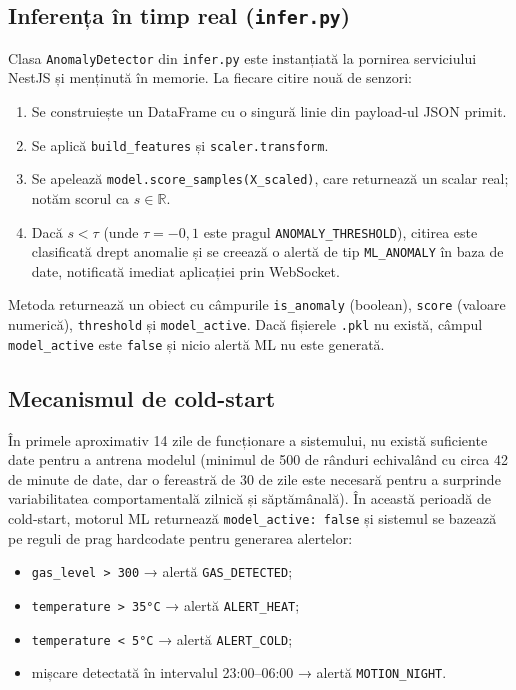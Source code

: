 \subsection{Inferența în timp real (\texttt{infer.py})}

Clasa \texttt{AnomalyDetector} din \texttt{infer.py} este instanțiată la pornirea
serviciului NestJS și menținută în memorie. La fiecare citire nouă de senzori:

\begin{enumerate}
  \item Se construiește un DataFrame cu o singură linie din payload-ul JSON primit.
  \item Se aplică \texttt{build\_features} și \texttt{scaler.transform}.
  \item Se apelează \texttt{model.score\_samples(X\_scaled)}, care returnează un scalar
    real; notăm scorul ca $s \in \mathbb{R}$.
  \item Dacă $s < \tau$ (unde $\tau = -0{,}1$ este pragul \texttt{ANOMALY\_THRESHOLD}),
    citirea este clasificată drept anomalie și se creează o alertă de tip
    \texttt{ML\_ANOMALY} în baza de date, notificată imediat aplicației prin WebSocket.
\end{enumerate}

Metoda returnează un obiect cu câmpurile \texttt{is\_anomaly} (boolean), \texttt{score}
(valoare numerică), \texttt{threshold} și \texttt{model\_active}. Dacă fișierele
\texttt{.pkl} nu există, câmpul \texttt{model\_active} este \texttt{false} și
nicio alertă ML nu este generată.

\subsection{Mecanismul de cold-start}

În primele aproximativ 14 zile de funcționare a sistemului, nu există suficiente date
pentru a antrena modelul (minimul de 500 de rânduri echivalând cu circa 42 de minute
de date, dar o fereastră de 30 de zile este necesară pentru a surprinde variabilitatea
comportamentală zilnică și săptămânală). În această perioadă de cold-start, motorul
ML returnează \texttt{model\_active: false} și sistemul se bazează pe reguli de prag
hardcodate pentru generarea alertelor:

\begin{itemize}
  \item \texttt{gas\_level > 300} → alertă \texttt{GAS\_DETECTED};
  \item \texttt{temperature > 35°C} → alertă \texttt{ALERT\_HEAT};
  \item \texttt{temperature < 5°C} → alertă \texttt{ALERT\_COLD};
  \item mișcare detectată în intervalul 23:00–06:00 → alertă \texttt{MOTION\_NIGHT}.
\end{itemize}

